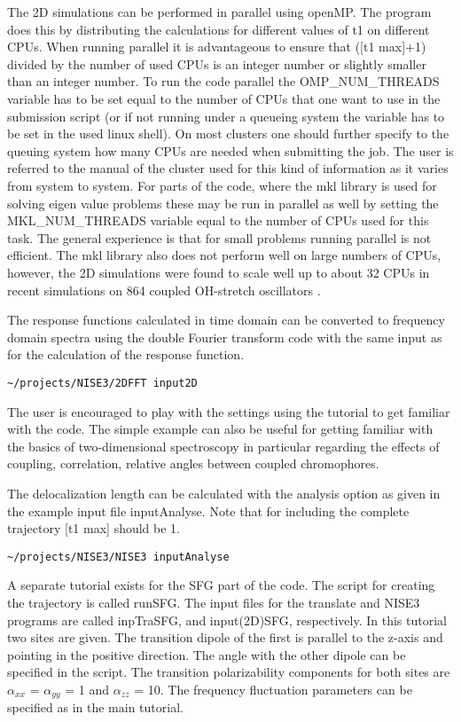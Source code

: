 The 2D simulations can be performed in parallel using openMP. The program does this by distributing the calculations for different values of t1 on different CPUs. When running parallel it is advantageous to ensure that ([t1 max]+1) divided by the number of used CPUs is an integer number or slightly smaller than an integer number. To run the code parallel the OMP\_NUM\_THREADS variable has to be set equal to the number of CPUs that one want to use in the submission script (or if not running under a queueing system the variable has to be set in the used linux shell). On most clusters one should further specify to the queuing system how many CPUs are needed when submitting the job. The user is referred to the manual of the cluster used for this kind of information as it varies from system to system. For parts of the code, where the mkl library is used for solving eigen value problems these may be run in parallel as well by setting the MKL\_NUM\_THREADS variable equal to the number of CPUs used for this task. The general experience is that for small problems running parallel is not efficient. The mkl library also does not perform well on large numbers of CPUs, however, the 2D simulations were found to scale well up to about 32 CPUs in recent simulations on 864 coupled OH-stretch oscillators \cite{Shi.2016.PCCP}.

The response functions calculated in time domain can be converted to frequency domain spectra using the double Fourier transform code with the same input as for the calculation of the response function.
\begin{verbatim}
~/projects/NISE3/2DFFT input2D
\end{verbatim}

The user is encouraged to play with the settings using the tutorial to get familiar with the code.
The simple example can also be useful for getting familiar with the basics of two-dimensional spectroscopy in particular regarding the effects of coupling, correlation, relative angles between
coupled chromophores.

The delocalization length \cite{Thouless.1974.PR.13.93} can be calculated with the analysis option as given in 
the example input file inputAnalyse. Note that for including the complete trajectory [t1 
max] should be 1. 
\begin{verbatim}
~/projects/NISE3/NISE3 inputAnalyse 
\end{verbatim}
A separate tutorial exists for the SFG part of the code. The script for creating the 
trajectory is called runSFG. The input files for the translate and NISE3 programs are 
called inpTraSFG, and input(2D)SFG, respectively. In this tutorial two sites are given. The 
transition dipole of the first is parallel to the z-axis and pointing in the positive direction. 
The angle with the other dipole can be specified in the script. The transition polarizability 
components for both sites are $\alpha_{xx}$ = $\alpha_{yy}$ = 1 and $\alpha_{zz}$ = 10. The frequency fluctuation 
parameters can be specified as in the main tutorial.

